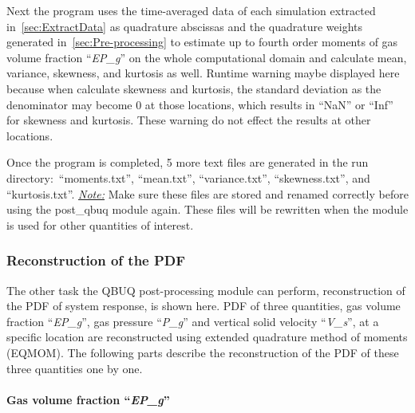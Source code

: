 \documentclass[a4paper,12pt,titlepage]{article}
\begin{document}
Next the program uses the time-averaged data of each simulation extracted 
in~\ref{sec:ExtractData} as quadrature abscissas and the quadrature weights 
generated in~\ref{sec:Pre-processing} to estimate up to fourth order moments of 
gas volume fraction ``\emph{EP\_g}'' on the whole computational domain and 
calculate mean, variance, skewness, and kurtosis as well. Runtime warning maybe
displayed here because when calculate skewness and kurtosis, the standard
deviation as the denominator may become 0 at those locations, which results in 
``NaN'' or ``Inf'' for skewness and kurtosis. These warning do not effect the 
results at other locations. 

Once the program is completed, 5 more text files are generated in the run 
directory:\ ``moments.txt'', ``mean.txt'', ``variance.txt'', ``skewness.txt'', 
and ``kurtosis.txt''. \emph{\underline{Note:}} Make sure these files are stored 
and renamed correctly before using the post\_qbuq module again. These files will 
be rewritten when the module is used for other quantities of interest.

\subsubsection{Reconstruction of the PDF}
\label{sec:Reconstruction}

The other task the QBUQ post-processing module can perform, reconstruction of 
the PDF of system response, is shown here. PDF of three quantities, gas
volume fraction ``\emph{EP\_g}'', gas pressure ``\emph{P\_g}'' and vertical
solid velocity ``\emph{V\_s}'', at a specific location are reconstructed using
extended quadrature method of moments 
(EQMOM)\cite{Chalons2010,YuanLaurentFox2011}. 
The following parts describe the reconstruction of the PDF of these three 
quantities one by one.

\paragraph{Gas volume fraction ``\emph{EP\_g}''}\mbox{}\\
\label{sec:ReconEPg}
\end{document}

